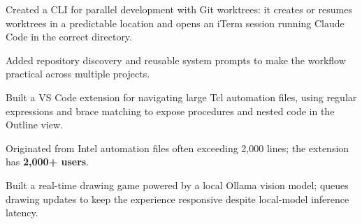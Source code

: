 \documentclass[]{plushcv}
\begin{document}
\begin{minipage}[t]{0.70\textwidth}
\begin{tightemize}
  \sectionsep
  \item Created a CLI for parallel development with Git worktrees: it creates or resumes worktrees in a predictable location and opens an iTerm session running Claude Code in the correct directory.
  \item Added repository discovery and reusable system prompts to make the workflow practical across multiple projects.
\end{tightemize}
\sectionsep

\begin{tightemize}
  \sectionsep
  \item Built a VS Code extension for navigating large Tcl automation files, using regular expressions and brace matching to expose procedures and nested code in the Outline view.
  \item Originated from Intel automation files often exceeding 2,000 lines; the extension has \textbf{2,000+ users}.
\end{tightemize}
\sectionsep

\begin{tightemize}
  \sectionsep
  \item Built a real-time drawing game powered by a local Ollama vision model; queues drawing updates to keep the experience responsive despite local-model inference latency.
\end{tightemize}
\sectionsep

\end{minipage}
\end{document}
